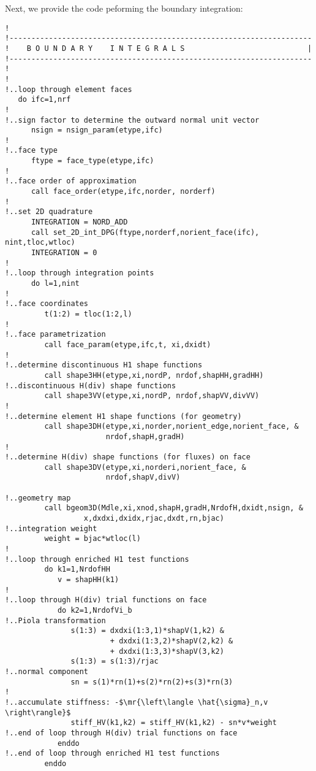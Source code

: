 Next, we provide the code peforming the boundary integration:
\begin{lstlisting}[mathescape,caption=\file{POISSON/ULTRAWEAK\_DPG/}\routine{elem}: boundary integration]
!
!---------------------------------------------------------------------
!    B O U N D A R Y    I N T E G R A L S                            |
!---------------------------------------------------------------------
! 
!
!..loop through element faces
   do ifc=1,nrf
!
!..sign factor to determine the outward normal unit vector
      nsign = nsign_param(etype,ifc)
!
!..face type
      ftype = face_type(etype,ifc)
!
!..face order of approximation
      call face_order(etype,ifc,norder, norderf)
!
!..set 2D quadrature
      INTEGRATION = NORD_ADD
      call set_2D_int_DPG(ftype,norderf,norient_face(ifc), nint,tloc,wtloc)
      INTEGRATION = 0
!
!..loop through integration points
      do l=1,nint
!
!..face coordinates
         t(1:2) = tloc(1:2,l)
!
!..face parametrization
         call face_param(etype,ifc,t, xi,dxidt)
!
!..determine discontinuous H1 shape functions
         call shape3HH(etype,xi,nordP, nrdof,shapHH,gradHH)
!..discontinuous H(div) shape functions
         call shape3VV(etype,xi,nordP, nrdof,shapVV,divVV)
!
!..determine element H1 shape functions (for geometry)
         call shape3DH(etype,xi,norder,norient_edge,norient_face, &
                       nrdof,shapH,gradH)
!
!..determine H(div) shape functions (for fluxes) on face
         call shape3DV(etype,xi,norderi,norient_face, &
                       nrdof,shapV,divV)

!..geometry map
         call bgeom3D(Mdle,xi,xnod,shapH,gradH,NrdofH,dxidt,nsign, &
                  x,dxdxi,dxidx,rjac,dxdt,rn,bjac)
!..integration weight
         weight = bjac*wtloc(l)
!
!..loop through enriched H1 test functions
         do k1=1,NrdofHH
            v = shapHH(k1)
!
!..loop through H(div) trial functions on face
            do k2=1,NrdofVi_b
!..Piola transformation
               s(1:3) = dxdxi(1:3,1)*shapV(1,k2) &
                        + dxdxi(1:3,2)*shapV(2,k2) &
                        + dxdxi(1:3,3)*shapV(3,k2)
               s(1:3) = s(1:3)/rjac
!..normal component
               sn = s(1)*rn(1)+s(2)*rn(2)+s(3)*rn(3)
!
!..accumulate stiffness: -$\mr{\left\langle \hat{\sigma}_n,v \right\rangle}$
               stiff_HV(k1,k2) = stiff_HV(k1,k2) - sn*v*weight
!..end of loop through H(div) trial functions on face
            enddo
!..end of loop through enriched H1 test functions
         enddo


\end{lstlisting}
